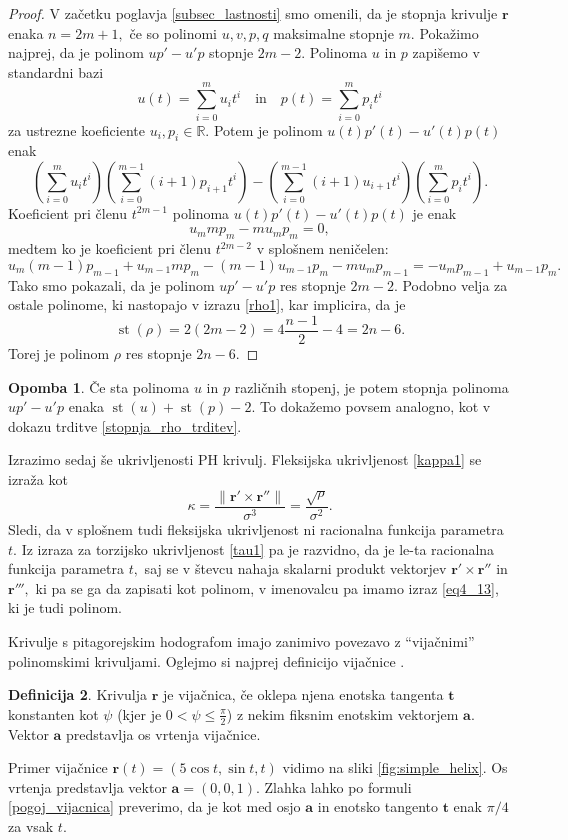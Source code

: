 \documentclass[12pt,a4paper,twoside]{article}
\theoremstyle{definition} %
\newtheorem{definicija}{Definicija}[section]
\newtheorem{opomba}[definicija]{Opomba}
\theoremstyle{plain} %
\theoremstyle{primerstyle}
\numberwithin{equation}{section}  %
\newcommand{\R}{\mathbb R}
\newcommand{\tV}{\mathbf{t}}
\newcommand{\aV}{\mathbf{a}}
\newcommand{\rV}{\mathbf{r}}
\DeclareMathOperator{\st}{st}
\begin{document}
\begin{proof}
	V začetku poglavja \ref{subsec_lastnosti} smo omenili, da je stopnja krivulje $\rV$ enaka $n=2m+1,$ če so polinomi $u,v,p,q$ maksimalne stopnje $m.$ Pokažimo najprej, da je polinom $up'-u'p$ stopnje $2m-2.$ Polinoma $u$ in $p$ zapišemo v standardni bazi
	$$u(t)=\sum_{i=0}^mu_it^i\quad\text{in}\quad p(t)=\sum_{i=0}^mp_it^i$$
	za ustrezne koeficiente $u_i,p_i\in\R.$ Potem je polinom $u(t)p'(t)-u'(t)p(t)$ enak
	\begin{equation*}
		\left(\sum_{i=0}^mu_it^i\right)\left(\sum_{i=0}^{m-1}(i+1)p_{i+1}t^i\right)-\left(\sum_{i=0}^{m-1}(i+1)u_{i+1}t^i\right)\left(\sum_{i=0}^mp_it^i\right).
	\end{equation*}
	Koeficient pri členu $t^{2m-1}$ polinoma $u(t)p'(t)-u'(t)p(t)$ je enak
	$$u_mmp_m-mu_mp_m=0,$$
	medtem ko je koeficient pri členu $t^{2m-2}$ v splošnem neničelen:
	$$u_m(m-1)p_{m-1}+u_{m-1}mp_m-(m-1)u_{m-1}p_m-mu_mp_{m-1}=-u_mp_{m-1}+u_{m-1}p_m.$$
	Tako smo pokazali, da je polinom $up'-u'p$ res stopnje $2m-2$. Podobno velja za ostale polinome, ki nastopajo v izrazu \eqref{rho1}, kar implicira, da je $$\st(\rho)=2(2m-2)=4\frac{n-1}{2}-4=2n-6.$$ Torej je polinom $\rho$ res stopnje $2n-6.$
\end{proof}

\begin{opomba}
	\label{opomba_proporpoly}
	Če sta polinoma $u$ in $p$ različnih stopenj, je potem stopnja polinoma $up'-u'p$ enaka $\st(u)+\st(p)-2.$ To dokažemo povsem analogno, kot v dokazu trditve \ref{stopnja_rho_trditev}.  
\end{opomba}

Izrazimo sedaj še ukrivljenosti PH krivulj. Fleksijska ukrivljenost \eqref{kappa1} se izraža kot
\begin{equation}
	\label{kappa2}
	\kappa=\frac{\lVert \rV' \times \rV'' \rVert}{\sigma^3}=\frac{\sqrt{\rho}}{\sigma^2}.
\end{equation}
Sledi, da v splošnem tudi fleksijska ukrivljenost ni racionalna funkcija parametra $t.$ Iz izraza za torzijsko ukrivljenost \eqref{tau1} pa je razvidno, da je le-ta racionalna funkcija parametra $t,$ saj se v števcu nahaja skalarni produkt vektorjev $\rV'\times \rV''$ in $\rV''',$ ki pa se ga da zapisati kot polinom, v imenovalcu pa imamo izraz \eqref{eq4_13}, ki je tudi polinom.

Krivulje s pitagorejskim hodografom imajo zanimivo povezavo z ``vijačnimi'' polinomskimi krivuljami. Oglejmo si najprej definicijo vijačnice \cite[str.\ 41]{kreyszig2019differential}.
\begin{definicija}
	\label{definicija_vijacnica}
	Krivulja $\rV$ je vijačnica, če oklepa njena enotska tangenta $\tV$ konstanten kot $\psi$ (kjer je $0<\psi \leq \frac{\pi}{2}$) z nekim fiksnim enotskim vektorjem $\aV.$ Vektor $\aV$ predstavlja os vrtenja vijačnice.
\end{definicija}
Primer vijačnice $\rV(t)=(5\cos{t},\sin{t},t)$ vidimo na sliki \ref{fig:simple_helix}. Os vrtenja predstavlja vektor $\aV=(0,0,1).$ Zlahka lahko po formuli \eqref{pogoj_vijacnica} preverimo, da je kot med osjo $\aV$ in enotsko tangento $\tV$ enak $\pi/4$ za vsak $t.$ 
\end{document}
